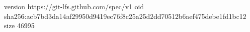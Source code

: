 version https://git-lfs.github.com/spec/v1
oid sha256:acb7bd3da14af29950d9419ec76f8c25a25d2dd70512b6aef475debe1fd1bc12
size 46995
